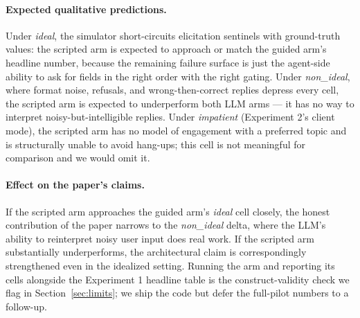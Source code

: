 \documentclass[11pt,a4paper]{article}
\begin{document}
\paragraph{Expected qualitative predictions.}
Under \emph{ideal}, the simulator short-circuits elicitation sentinels with ground-truth values: the scripted arm is expected to approach or match the guided arm's headline number, because the remaining failure surface is just the agent-side ability to ask for fields in the right order with the right gating. Under \emph{non\_ideal}, where format noise, refusals, and wrong-then-correct replies depress every cell, the scripted arm is expected to underperform both LLM arms --- it has no way to interpret noisy-but-intelligible replies. Under \emph{impatient} (Experiment 2's client mode), the scripted arm has no model of engagement with a preferred topic and is structurally unable to avoid hang-ups; this cell is not meaningful for comparison and we would omit it.

\paragraph{Effect on the paper's claims.}
If the scripted arm approaches the guided arm's \emph{ideal} cell closely, the honest contribution of the paper narrows to the \emph{non\_ideal} delta, where the LLM's ability to reinterpret noisy user input does real work. If the scripted arm substantially underperforms, the architectural claim is correspondingly strengthened even in the idealized setting. Running the arm and reporting its cells alongside the Experiment 1 headline table is the construct-validity check we flag in Section~\ref{sec:limits}; we ship the code but defer the full-pilot numbers to a follow-up.
\end{document}
